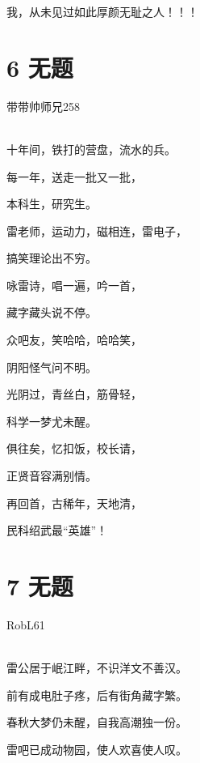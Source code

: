 \documentclass[UTF8,12pt,oneside]{ctexbook}
\begin{document}
        我，从未见过如此厚颜无耻之人！！！
        
    \newpage
    
    \section{6 无题}
    \begin{center}
        带带帅师兄258
        
        ~\\
        十年间，铁打的营盘，流水的兵。
        
        每一年，送走一批又一批，
        
        本科生，研究生。
        
        雷老师，运动力，磁相连，雷电子，
        
        搞笑理论出不穷。
        
        咏雷诗，唱一遍，吟一首，
        
        藏字藏头说不停。
        
        众吧友，笑哈哈，哈哈笑，
        
        阴阳怪气问不明。
        
        光阴过，青丝白，筋骨轻，
        
        科学一梦尤未醒。
        
        俱往矣，忆扣饭，校长请，
        
        正贤音容满别情。
        
        再回首，古稀年，天地清，
        
        民科绍武最“英雄”！

    \end{center}

    \newpage
    
    \section{7 无题}
    \begin{center}
        RobL61
        
        ~\\
        雷公居于岷江畔，不识洋文不善汉。
        
        前有成电肚子疼，后有街角藏字繁。
        
        春秋大梦仍未醒，自我高潮独一份。
        
        雷吧已成动物园，使人欢喜使人叹。

        ~\\

    \end{center}
\end{document}

